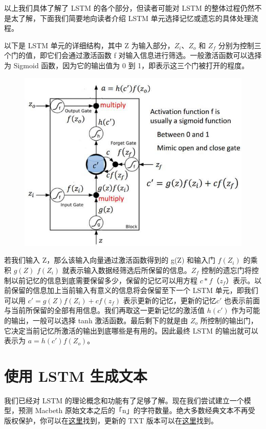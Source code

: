 \documentclass{article}
\begin{document}
以上我们具体了解了 LSTM 的各个部分，但读者可能对 LSTM 的整体过程仍然不是太了解，下面我们简要地向读者介绍 LSTM 单元选择记忆或遗忘的具体处理流程。

以下是 LSTM 单元的详细结构，其中 Z 为输入部分，$Z_i$、$Z_o$ 和 $Z_f$ 分别为控制三个门的值，即它们会通过激活函数 f 对输入信息进行筛选。一般激活函数可以选择为 Sigmoid 函数，因为它的输出值为 0 到 1，即表示这三个门被打开的程度。
\begin{figure}[H]
	\centering
	\includegraphics[scale=0.3]{6.jpg}
\end{figure}
若我们输入 Z，那么该输入向量通过激活函数得到的 g(Z) 和输入门 $f(Z_i)$ 的乘积 $g(Z)$ $f(Z_i )$ 就表示输入数据经筛选后所保留的信息。$Z_f$ 控制的遗忘门将控制以前记忆的信息到底需要保留多少，保留的记忆可以用方程 $c*f（z_f$）表示。以前保留的信息加上当前输入有意义的信息将会保留至下一个 LSTM 单元，即我们可以用 $c' = g(Z)f(Z_i) + cf(z_f)$ 表示更新的记忆，更新的记忆$ c'$ 也表示前面与当前所保留的全部有用信息。我们再取这一更新记忆的激活值 $h(c')$ 作为可能的输出，一般可以选择 tanh 激活函数。最后剩下的就是由 $Z_o$ 所控制的输出门，它决定当前记忆所激活的输出到底哪些是有用的。因此最终 LSTM 的输出就可以表示为 $a = h(c')f(Z_o)$。
\section{ 使用 LSTM 生成文本}

我们已经对 LSTM 的理论概念和功能有了足够了解。现在我们尝试建立一个模型，预测 Macbeth 原始文本之后的「n」的字符数量。绝大多数经典文本不再受版权保护，你可以在\href{https://www.gutenberg.org/}{这里}找到，更新的 TXT 版本可以在\href{https://s3-ap-south-1.amazonaws.com/av-blog-media/wp-content/uploads/2017/12/10165151/macbeth.txt}{这里}找到。
\end{document}
